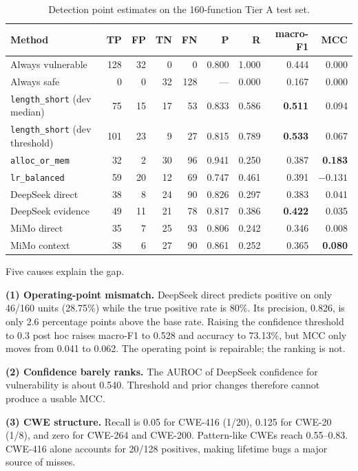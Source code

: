 \documentclass[conference]{IEEEtran}
\newcommand{\best}[1]{\textbf{#1}}
\begin{document}
\begin{table}[t]
\centering
\caption{Detection point estimates on the 160-function Tier A test set.}
\label{tab:detect}
\footnotesize
\setlength{\tabcolsep}{4pt}
\begin{tabular}{@{}lrrrrrrrr@{}}
\toprule
Method & TP & FP & TN & FN & P & R & macro-F1 & MCC \\
\midrule
Always vulnerable & 128 & 32 & 0 & 0 & 0.800 & 1.000 & 0.444 & 0.000 \\
Always safe & 0 & 0 & 32 & 128 & --- & 0.000 & 0.167 & 0.000 \\
\texttt{length\_short} (dev median) & 75 & 15 & 17 & 53 & 0.833 & 0.586 & \best{0.511} & 0.094 \\
\texttt{length\_short} (dev threshold) & 101 & 23 & 9 & 27 & 0.815 & 0.789 & \best{0.533} & 0.067 \\
\texttt{alloc\_or\_mem} & 32 & 2 & 30 & 96 & 0.941 & 0.250 & 0.387 & \best{0.183} \\
\texttt{lr\_balanced} & 59 & 20 & 12 & 69 & 0.747 & 0.461 & 0.391 & $-0.131$ \\
DeepSeek direct & 38 & 8 & 24 & 90 & 0.826 & 0.297 & 0.383 & 0.041 \\
DeepSeek evidence & 49 & 11 & 21 & 78 & 0.817 & 0.386 & \best{0.422} & 0.035 \\
MiMo direct & 35 & 7 & 25 & 93 & 0.806 & 0.242 & 0.346 & 0.008 \\
MiMo context & 38 & 6 & 27 & 90 & 0.861 & 0.252 & 0.365 & \best{0.080} \\
\bottomrule
\end{tabular}
\end{table}

Five causes explain the gap.

\textbf{(1) Operating-point mismatch.} DeepSeek direct predicts positive on only 46/160 units (28.75\%) while the true positive rate is 80\%. Its precision, 0.826, is only 2.6 percentage points above the base rate. Raising the confidence threshold to 0.3 post hoc raises macro-F1 to 0.528 and accuracy to 73.13\%, but MCC only moves from 0.041 to 0.062. The operating point is repairable; the ranking is not.

\textbf{(2) Confidence barely ranks.} The AUROC of DeepSeek confidence for vulnerability is about 0.540. Threshold and prior changes therefore cannot produce a usable MCC.

\textbf{(3) CWE structure.} Recall is 0.05 for CWE-416 (1/20), 0.125 for CWE-20 (1/8), and zero for CWE-264 and CWE-200. Pattern-like CWEs reach 0.55--0.83. CWE-416 alone accounts for 20/128 positives, making lifetime bugs a major source of misses.
\end{document}
